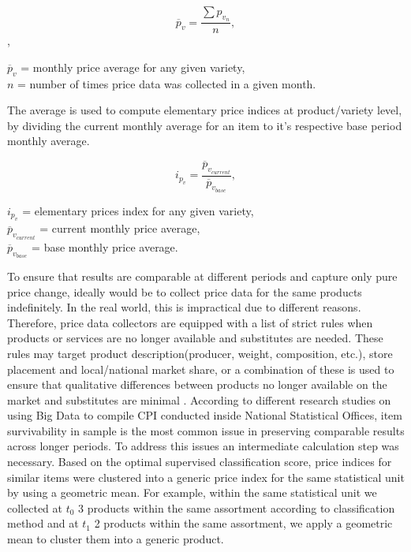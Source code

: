 \documentclass[]{article}
\begin{document}
\begin{equation}\label{eq:1}
\overline{p}_{v} = \frac{\sum{p_{v_{n}}}}{n} ,
\end{equation} ,

\begin{center} 
	$\overline{p}_{v}$ = monthly price average for any given variety, \\
	$n$ = number of times price data was collected in a given month. \\
\end{center}

The average is used to compute elementary 
price indices at product/variety level, by dividing the current monthly average for an item to it's respective base period monthly average. 

\begin{equation}\label{eq:2}
i_{p_{v}} = \frac{\overline{p}_{v_{current}}}{\overline{p}_{v_{base}}} ,
\end{equation}

\begin{center}	
	$i_{p_{v}}$ = elementary prices index for any given variety, \\
	$\overline{p}_{v_{current}}$ = current monthly price average, \\
	$\overline{p}_{v_{base}}$ = base monthly price average.
\end{center} 

To ensure that results are comparable at different periods and capture only pure price change, ideally would be to collect price data for the same products indefinitely\cite{cpi2}. In the real world, this is impractical due to different reasons. Therefore, price data collectors are equipped with a list of strict rules when products or services are no longer available and substitutes are needed. These rules may target product description(producer, weight, composition, etc.), store placement and local/national market share, or a combination of these is used to ensure that qualitative differences between products no longer available on the market and substitutes are minimal \cite{cpi}. According to different research studies on using Big Data to compile CPI conducted inside National Statistical Offices, item survivability in sample is the most common issue in preserving comparable results across longer periods\cite{ons2017, willenborg2017, tranzitivity, kints}. To address this issues an intermediate calculation step was necessary. Based on the optimal supervised classification score, price indices for similar items were clustered into a generic price index for the same statistical unit by using a geometric mean. For example, within the same statistical unit we collected at $t_{0}$ 3 products within the same assortment according to classification method and at $t_{1}$ 2 products within the same assortment, we apply a geometric mean to cluster them into a generic product.   
\end{document}
